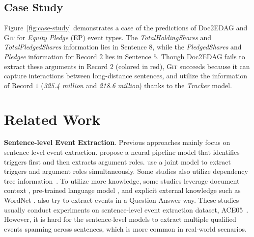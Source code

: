 \documentclass[11pt,a4paper]{article}
\newcommand{\modelname}{\textsc{Git}\xspace}
\begin{document}
\subsection{Case Study}
Figure~\ref{fig:case-study} demonstrates a case of the predictions of Doc2EDAG and \modelname for \textit{Equity Pledge} (EP) event types.
The \textit{TotalHoldingShares} and \textit{TotalPledgedShares} information lies in Sentence $8$, while the \textit{PledgedShares} and \textit{Pledgee} information for Record $2$ lies in Sentence $5$.
Though Doc2EDAG fails to extract these arguments in Record $2$ (colored in red), \modelname succeeds because it can capture interactions between long-distance sentences, and utilize the information of Record $1$ (\textit{325.4 million} and \textit{218.6 million}) thanks to the \textit{Tracker} model. \section{Related Work}

\textbf{Sentence-level Event Extraction}. 
Previous approaches mainly focus on sentence-level event extraction.
\citet{chen-etal-2015-event} propose a neural pipeline model that identifies triggers first and then extracts argument roles.
\citet{nguyen-etal-2016-joint} use a joint model to extract triggers and argument roles simultaneously.
Some studies also utilize dependency tree information~\citep{liu-etal-2018-jointly, yan-etal-2019-event}.
To utilize more knowledge, some studies leverage 
document context \citep{chen-etal-2018-collective, zhao-etal-2018-document}, pre-trained language model \citep{yang-etal-2019-exploring-pre}, and explicit external knowledge \citep{DBLP:conf/aaai/Liu0019, tong-etal-2020-improving} such as WordNet \citep{DBLP:journals/cacm/Miller95}.
\citet{du-cardie-2020-event} also try to extract events in a Question-Answer way.
These studies usually conduct experiments on sentence-level event extraction dataset,  ACE05~\citep{ace05}.
However, it is hard for the sentence-level models to extract multiple qualified events spanning across sentences, which is more common in real-world scenarios.
\end{document}
